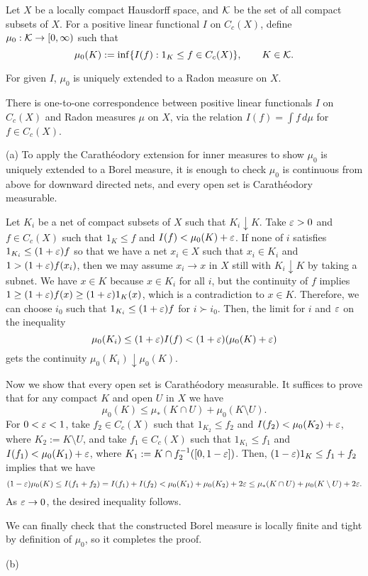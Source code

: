 \documentclass{../../large}
\begin{document}
\begin{prb}
Let $X$ be a locally compact Hausdorff space, and $\mathcal{K}$ be the set of all compact subsets of $X$.
For a positive linear functional $I$ on $C_c(X)$, define $\mu_0:\mathcal{K}\to[0,\infty)$ such that
\[\mu_0(K):=\inf\{I(f):1_K\le f\in C_c(X)\},\qquad K\in\mathcal{K}.\]
\begin{parts}
\item For given $I$, $\mu_0$ is uniquely extended to a Radon measure on $X$.
\item There is one-to-one correspondence between positive linear functionals $I$ on $C_c(X)$ and Radon measures $\mu$ on $X$, via the relation $I(f)=\int f\,d\mu$ for $f\in C_c(X)$.
\end{parts}
\end{prb}
\begin{pf}
(a)
To apply the Carath\'eodory extension for inner measures to show $\mu_0$ is uniquely extended to a Borel measure, it is enough to check $\mu_0$ is continuous from above for downward directed nets, and every open set is Carath\'eodory measurable.

Let $K_i$ be a net of compact subsets of $X$ such that $K_i\downarrow K$.
Take $\varepsilon>0$ and $f\in C_c(X)$ such that $1_K\le f$ and $I(f)<\mu_0(K)+\varepsilon$.
If none of $i$ satisfies $1_{K_i}\le(1+\varepsilon)f$ so that we have a net $x_i\in X$ such that $x_i\in K_i$ and $1>(1+\varepsilon)f(x_i)$, then we may assume $x_i\to x$ in $X$ still with $K_i\downarrow K$ by taking a subnet.
We have $x\in K$ because $x\in K_i$ for all $i$, but the continuity of $f$ implies $1\ge(1+\varepsilon)f(x)\ge(1+\varepsilon)1_K(x)$, which is a contradiction to $x\in K$.
Therefore, we can choose $i_0$ such that $1_{K_i}\le(1+\varepsilon)f$ for $i\succ i_0$.
Then, the limit for $i$ and $\varepsilon$ on the inequality
\[\mu_0(K_i)\le(1+\varepsilon)I(f)<(1+\varepsilon)(\mu_0(K)+\varepsilon)\]
gets the continuity $\mu_0(K_i)\downarrow\mu_0(K)$.

Now we show that every open set is Carath\'eodory measurable.
It suffices to prove that for any compact $K$ and open $U$ in $X$ we have
\[\mu_0(K)\le\mu_*(K\cap U)+\mu_0(K\setminus U).\]
For $0<\varepsilon<1$, take $f_2\in C_c(X)$ such that $1_{K_2}\le f_2$ and $I(f_2)<\mu_0(K_2)+\varepsilon$, where $K_2:=K\setminus U$, and take $f_1\in C_c(X)$ such that $1_{K_1}\le f_1$ and $I(f_1)<\mu_0(K_1)+\varepsilon$, where $K_1:=K\cap f_2^{-1}([0,1-\varepsilon])$.
Then, $(1-\varepsilon)1_K\le f_1+f_2$ implies that we have
\[(1-\varepsilon)\mu_0(K)\le I(f_1+f_2)=I(f_1)+I(f_2)<\mu_0(K_1)+\mu_0(K_2)+2\varepsilon\le\mu_*(K\cap U)+\mu_0(K\setminus U)+2\varepsilon.\]
As $\varepsilon\to0$, the desired inequality follows.

We can finally check that the constructed Borel measure is locally finite and tight by definition of $\mu_0$, so it completes the proof.

(b)
\end{pf}
\end{document}

